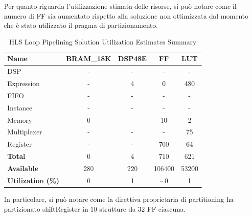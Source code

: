 Per quanto riguarda l'utilizzazione stimata delle risorse, si può notare come il numero di FF sia aumentato rispetto alla soluzione non ottimizzata dal momento che è stato utilizzato il pragma di partizionamento.

\begin{table}[H]
    \centering
    \begin{tabular}{|l|c|c|c|c|}
        \hline
        \textbf{Name}    & \textbf{BRAM\_18K} & \textbf{DSP48E} & \textbf{FF} & \textbf{LUT} \\ \hline
        DSP              & -                   & -               & -           & -            \\ 
        Expression       & -                   & 4               & 0           & 480          \\ 
        FIFO             & -                   & -               & -           & -            \\ 
        Instance         & -                   & -               & -           & -            \\ 
        Memory           & 0                   & -               & 10          & 2            \\ 
        Multiplexer      & -                   & -               & -           & 75          \\ 
        Register         & -                   & -               & 700         & 64            \\ \hline
        \textbf{Total}   & 0                   & 4               & 710         & 621          \\ \hline
        \textbf{Available} & 280               & 220             & 106400      & 53200        \\ \hline
        \textbf{Utilization (\%)} & 0            & 1              & $\sim$0     & 1      \\ \hline
    \end{tabular}
    \caption{HLS Loop Pipelining Solution Utilization Estimates Summary}
    \label{tab:hls-loop-pipelining-solution-utilization-estimates-summary}
\end{table}

In particolare, si può notare come la direttiva proprietaria di partitioning ha partizionato shiftRegister in 10 strutture da 32 FF ciascuna.


